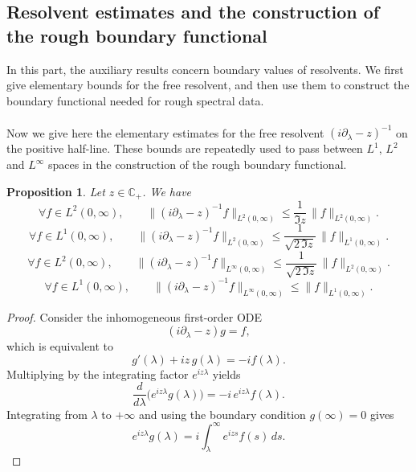 \documentclass[10pt]{article}
\newtheorem{proposition}[theorem]{Proposition}
\numberwithin{equation}{section}
\numberwithin{theorem}{section}
\begin{document}
\begin{appendix}
\subsection{Resolvent estimates and the
construction of the rough boundary functional}
In this part, the auxiliary results concern boundary values of resolvents.
We first give elementary bounds for the free resolvent, and then use them to
construct the boundary functional needed for rough spectral data.\\\\
Now we give here the elementary estimates for the free resolvent
\((i\partial_\lambda-z)^{-1}\) on the positive half-line. These bounds are repeatedly
used to pass between \(L^1\), \(L^2\) and \(L^\infty\) spaces in the construction of the rough boundary functional.

\begin{proposition}
\label{prop 2}
Let $z\in\mathbb C_{+}$. We have
\begin{equation}\label{eq:L1-L2-bound 4}
\forall f \in L^2(0,\infty), \qquad \|(i\partial_\lambda-z)^{-1}f\|_{L^2(0,\infty)}
\leq \frac{1}{\Im z}\,\|f\|_{L^2(0,\infty)}.
\end{equation}
\begin{equation}\label{eq:L1-L2-bound 1}
\forall f \in L^1(0,\infty), \qquad \|(i\partial_\lambda-z)^{-1}f\|_{L^2(0,\infty)}
\leq \frac{1}{\sqrt{2\,\Im z}}\,\|f\|_{L^1(0,\infty)}.
\end{equation}
\begin{equation}\label{eq:L1-L2-bound 2}
\forall f \in L^2(0,\infty), \qquad \|(i\partial_\lambda-z)^{-1}f\|_{L^\infty(0,\infty)}
\leq \frac{1}{\sqrt{2\,\Im z}}\,\|f\|_{L^2(0,\infty)}.
\end{equation}
\begin{equation}\label{eq:L1-L2-bound 3}
\forall f \in L^1(0,\infty), \qquad\|(i\partial_\lambda-z)^{-1}f\|_{L^\infty(0,\infty)}
\leq \|f\|_{L^1(0,\infty)}.
\end{equation}
\end{proposition}
\begin{proof}
Consider the inhomogeneous first-order ODE
\[
(i\partial_\lambda-z)g=f,
\]
which is equivalent to
\[
g'(\lambda)+iz\,g(\lambda)=-i f(\lambda).
\]
Multiplying by the integrating factor $e^{iz\lambda}$ yields
\[
\frac{d}{d\lambda}\bigl(e^{iz\lambda}g(\lambda)\bigr)
=-i\,e^{iz\lambda}f(\lambda).
\]
Integrating from $\lambda$ to $+\infty$ and using the boundary condition $g(\infty)=0$ gives
\[
e^{iz\lambda}g(\lambda)
= i\int_\lambda^\infty e^{iz s} f(s)\,ds.
\]
\end{proof}
\end{appendix}
\end{document}
